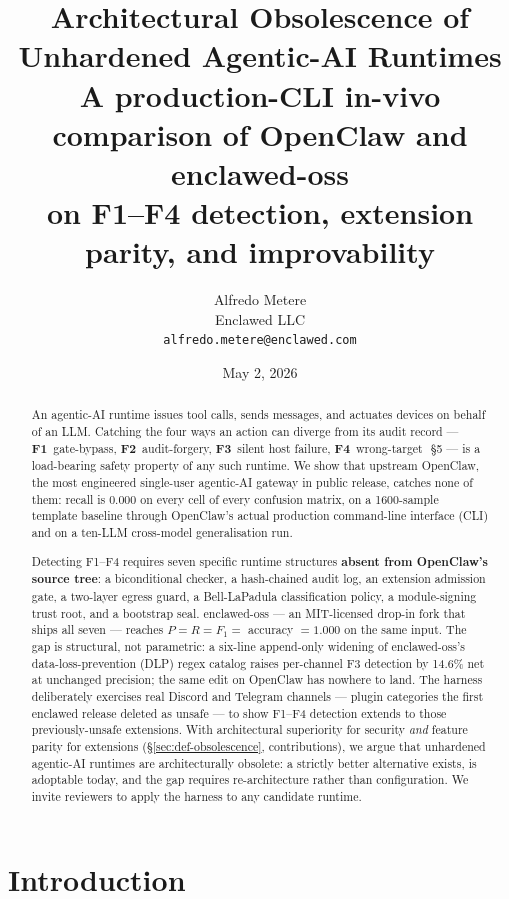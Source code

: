 \documentclass[11pt]{article}
\title{
  \textbf{Architectural Obsolescence of Unhardened Agentic-AI Runtimes}\\[2pt]
  \large A production-CLI in-vivo comparison of OpenClaw and enclawed-oss\\
  on F1--F4 detection, extension parity, and improvability
}
\author{%
  Alfredo Metere\\
  Enclawed LLC\\
  \texttt{alfredo.metere@enclawed.com}
}
\date{May 2, 2026}
\begin{document}
\maketitle

\begin{abstract}
An agentic-AI runtime issues tool calls, sends messages, and
actuates devices on behalf of an LLM. Catching the four ways an
action can diverge from its audit record ---
\textbf{F1}~gate-bypass, \textbf{F2}~audit-forgery, \textbf{F3}~silent
host failure, \textbf{F4}~wrong-target~\cite{Metere2026enclawed}\,§5
--- is a load-bearing safety property of any such runtime. We show
that upstream OpenClaw, the most engineered single-user agentic-AI
gateway in public release, catches none of them: recall is 0.000 on
every cell of every confusion matrix, on a 1600-sample template
baseline through OpenClaw's actual production command-line
interface (CLI) and on a ten-LLM cross-model generalisation run.

Detecting F1--F4 requires seven specific runtime structures
\textbf{absent from OpenClaw's source tree}: a biconditional
checker, a hash-chained audit log, an extension admission gate, a
two-layer egress guard, a Bell-LaPadula classification policy, a
module-signing trust root, and a bootstrap seal. enclawed-oss ---
an MIT-licensed drop-in fork that ships all seven --- reaches
$P = R = F_1 =$ accuracy $= 1.000$ on the same input. The gap is
structural, not parametric: a six-line append-only widening of
enclawed-oss's data-loss-prevention (DLP) regex catalog raises
per-channel F3 detection by
14.6\% net at unchanged precision; the same edit on OpenClaw has
nowhere to land. The harness deliberately exercises real Discord
and Telegram channels --- plugin categories the first enclawed
release deleted as unsafe --- to show F1--F4 detection extends to
those previously-unsafe extensions. With architectural superiority
for security \emph{and} feature parity for extensions
(\S\ref{sec:def-obsolescence}, contributions), we argue that
unhardened agentic-AI runtimes are architecturally obsolete: a
strictly better alternative exists, is adoptable today, and the gap
requires re-architecture rather than configuration. We invite
reviewers to apply the harness to any candidate runtime.
\end{abstract}

\section{Introduction}
\end{document}
